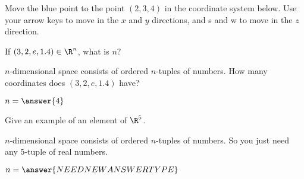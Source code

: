 \begin{question}
Move the blue point to the point $(2,3,4)$ in the coordinate system below. Use your arrow keys to move in the $x$ and $y$ directions, and s and w to move in the $z$ direction.
\end{question}

\begin{question}
	If $(3,2,e,1.4) \in \R^n$, what is $n$?
	\begin{solution}
		\begin{hint}
		$n$-dimensional space consists of ordered $n$-tuples of numbers.  How many coordinates does $(3,2,e,1.4)$ have?
		\end{hint}
	$n = \answer{4}$
	\end{solution}
\end{question}

\begin{question}
	Give an example of an element of $\R^5$.
	\begin{solution}
		\begin{hint}
		$n$-dimensional space consists of ordered $n$-tuples of numbers.  So you just need any $5$-tuple of real numbers.
		\end{hint}
	$n = \answer{NEED NEW ANSWER TYPE}$
	\end{solution}
\end{question}

